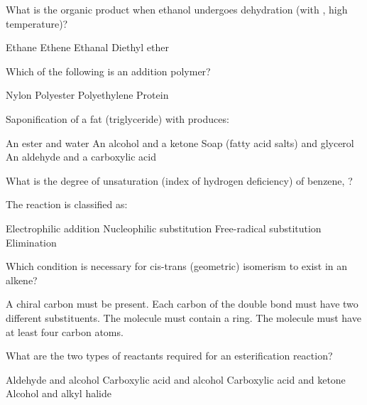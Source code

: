 \documentclass[addpoints]{exam}
\begin{document}
\begin{questions}
\question[1] What is the organic product when ethanol undergoes dehydration (with ,
high temperature)?
\begin{choices}
    \choice Ethane
    \correctchoice Ethene
    \choice Ethanal
    \choice Diethyl ether
\end{choices}

\question[1] Which of the following is an addition polymer?
\begin{choices}
    \choice Nylon
    \choice Polyester
    \correctchoice Polyethylene
    \choice Protein
\end{choices}

\question[1] Saponification of a fat (triglyceride) with  produces:
\begin{choices}
    \choice An ester and water
    \choice An alcohol and a ketone
    \correctchoice Soap (fatty acid salts) and glycerol
    \choice An aldehyde and a carboxylic acid
\end{choices}

\question[1] What is the degree of unsaturation (index of hydrogen deficiency) of benzene,
?
\begin{choices}
\end{choices}

\question[1] The reaction  is classified as:
\begin{choices}
    \choice Electrophilic addition
    \choice Nucleophilic substitution
    \correctchoice Free-radical substitution
    \choice Elimination
\end{choices}

\question[1] Which condition is necessary for cis-trans (geometric) isomerism to exist in an
alkene?
\begin{choices}
    \choice A chiral carbon must be present.
    \correctchoice Each carbon of the double bond must have two different substituents.
    \choice The molecule must contain a ring.
    \choice The molecule must have at least four carbon atoms.
\end{choices}

\question[1] What are the two types of reactants required for an esterification reaction?
\begin{choices}
    \choice Aldehyde and alcohol
    \correctchoice Carboxylic acid and alcohol
    \choice Carboxylic acid and ketone
    \choice Alcohol and alkyl halide
\end{choices}


\end{questions}
\end{document}
